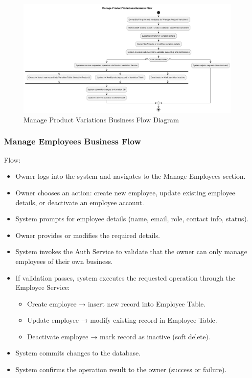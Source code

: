 \documentclass[]{VUMIFTemplateClass}
\begin{document}
\begin{figure}[H]
    \centering
    \includegraphics[width=1\textwidth]{images/diagrams/business/bpmn_product_variations.png}
    \caption{Manage Product Variations Business Flow Diagram}
    \label{fig:product_variations_manage_flow}
\end{figure}

\subsubsection{Manage Employees Business Flow}
Flow:
\begin{itemize}
\setlength{\itemsep}{2pt}
\setlength{\parskip}{0pt}
\setlength{\parsep}{0pt}
\item Owner logs into the system and navigates to the Manage Employees section.
\item Owner chooses an action: create new employee, update existing employee details, or deactivate an employee account.
\item System prompts for employee details (name, email, role, contact info, status).
\item Owner provides or modifies the required details.
\item System invokes the Auth Service to validate that the owner can only manage employees of their own
business.
\item If validation passes, system executes the requested operation through the Employee Service:
\begin{itemize}
\item Create employee → insert new record into Employee Table.
\item Update employee → modify existing record in Employee Table.
\item Deactivate employee → mark record as inactive (soft delete).
\end{itemize}
\item System commits changes to the database.
\item System confirms the operation result to the owner (success or failure).
\end{itemize}
\end{document}
